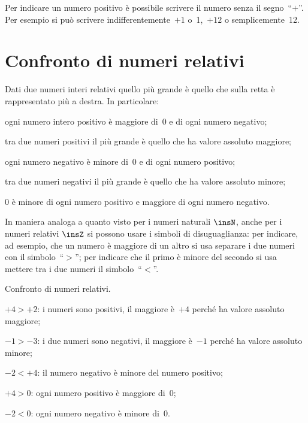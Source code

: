 \osservazione Per indicare un numero positivo è possibile scrivere il numero senza il segno~``$+$''.
Per esempio si può scrivere indifferentemente~$+1$ o~1,~$+12$ o semplicemente~12.

\section{Confronto di numeri relativi}

Dati due numeri interi relativi quello più grande è quello che sulla retta è rappresentato più a destra.
In particolare:
 \begin{enumeratea}
 \item ogni numero intero positivo è maggiore di~0 e di ogni numero negativo;
 \item tra due numeri positivi il più grande è quello che ha valore assoluto maggiore;
 \item ogni numero negativo è minore di~0 e di ogni numero positivo;
 \item tra due numeri negativi il più grande è quello che ha valore assoluto minore;
 \item 0 è minore di ogni numero positivo e maggiore di ogni numero negativo.
 \end{enumeratea}

In maniera analoga a quanto visto per i numeri naturali $\insN$, anche per i numeri relativi $\insZ$ si possono usare i simboli di disuguaglianza: per indicare, ad esempio, che un numero è maggiore di un altro si usa separare i due numeri con il
simbolo~``$>$''; per indicare che il primo è minore del secondo si usa mettere tra i due numeri il simbolo~``$<$''.

\begin{exrig}
 \begin{esempio}
 Confronto di numeri relativi.
 \begin{itemize*}
 \item $+4>+2$: i numeri sono positivi, il maggiore è~$+4$ perché ha valore assoluto maggiore;
 \item $-1>-3$: i due numeri sono negativi, il maggiore è~$-1$ perché ha valore assoluto minore;
 \item $-2<+4$: il numero negativo è minore del numero positivo;
 \item $+4>0$: ogni numero positivo è maggiore di~0;
 \item $-2<0$: ogni numero negativo è minore di~0.
 \end{itemize*}
 \end{esempio}
\end{exrig}

